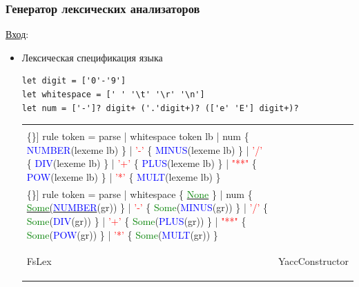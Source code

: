 \documentclass{beamer}
\begin{document}
\begin{frame}[fragile]
\transwipe[direction=90]
\frametitle{Генератор лексических анализаторов}
\underline{Вход}: \\ 
\begin{itemize}
\item Лексическая спецификация языка
\begin{verbatim}
let digit = ['0'-'9']
let whitespace = [' ' '\t' '\r' '\n']
let num = ['-']? digit+ ('.'digit+)? (['e' 'E'] digit+)?
\end{verbatim}
\begin{tabular}{l | r}
\begin{minipage}{.4\textwidth} 
\footnotesize 
\begin{Verbatim}[commandchars=\\\{\}]
rule token = parse
| whitespace { token lb }
| num  \{ \textcolor{blue}{NUMBER}(lexeme lb) \}
| \textcolor{red}{'-'}  \{ \textcolor{blue}{MINUS}(lexeme lb) \}
| \textcolor{red}{'/'}  \{ \textcolor{blue}{DIV}(lexeme lb) \}
| \textcolor{red}{'+'}  \{ \textcolor{blue}{PLUS}(lexeme lb) \}
| \textcolor{red}{"**"} \{ \textcolor{blue}{POW}(lexeme lb) \}
| \textcolor{red}{'*'}  \{ \textcolor{blue}{MULT}(lexeme lb) \}
\end{Verbatim}
\normalsize
\end{minipage}
&
\begin{minipage}{.4\textwidth}
 \footnotesize 
\begin{Verbatim}[commandchars=\\\{\}]
rule token = parse
| whitespace \{ \underline{\textcolor{green}{None}} \}
| num  \{ \underline{\textcolor{green}{Some}(\textcolor{blue}{NUMBER}}(gr)) \}
| \textcolor{red}{'-'}  \{ \textcolor{green}{Some}(\textcolor{blue}{MINUS}(gr)) \}
| \textcolor{red}{'/'}  \{ \textcolor{green}{Some}(\textcolor{blue}{DIV}(gr)) \}
| \textcolor{red}{'+'}  \{ \textcolor{green}{Some}(\textcolor{blue}{PLUS}(gr)) \}
| \textcolor{red}{"**"} \{ \textcolor{green}{Some}(\textcolor{blue}{POW}(gr)) \}
| \textcolor{red}{'*'}  \{ \textcolor{green}{Some}(\textcolor{blue}{MULT}(gr)) \}
\end{Verbatim} 
\normalsize
\end{minipage} \\
\hline 

\begin{minipage}{.4\textwidth}
\begin{center}
 \footnotesize FsLex 
 \normalsize
 \end{center}
\end{minipage}
&
\begin{minipage}{.4\textwidth}
\begin{center}
 \footnotesize YaccConstructor 
 \normalsize
 \end{center}
\end{minipage}
\end{tabular}


\end{itemize}
\end{frame}
\end{document}
